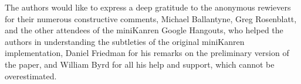 The authors would like to express a deep gratitude to the anonymous rewievers for their numerous constructive comments, Michael Ballantyne, Greg Rosenblatt, 
and the other attendees of the miniKanren Google Hangouts, who helped the authors in understanding the subtleties of the original miniKanren
implementation, Daniel Friedman for his remarks on the preliminary version of the paper, and William Byrd for all his help and support, which cannot be
overestimated.

